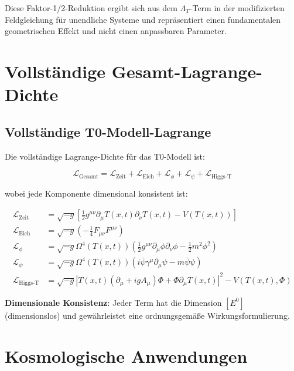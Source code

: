 \documentclass[12pt,a4paper]{article}
\newcommand{\Tfield}{T(x,t)}
\newcommand{\DhiggsT}{\Tfield (\partial_\mu + ig A_\mu) \Phi + \Phi \partial_\mu \Tfield}
\theoremstyle{definition}
\theoremstyle{remark}
\begin{document}
	Diese Faktor-1/2-Reduktion ergibt sich aus dem $\Lambda_T$-Term in der modifizierten Feldgleichung für unendliche Systeme und repräsentiert einen fundamentalen geometrischen Effekt und nicht einen anpassbaren Parameter.
	
	\section{Vollständige Gesamt-Lagrange-Dichte}
	\label{sec:gesamt_lagrange}
	
	\subsection{Vollständige T0-Modell-Lagrange}
	\label{subsec:vollstaendige_lagrange}
	
	Die vollständige Lagrange-Dichte für das T0-Modell ist:
	
	\begin{equation}
		\mathcal{L}_{\text{Gesamt}} = \mathcal{L}_{\text{Zeit}} + \mathcal{L}_{\text{Eich}} + \mathcal{L}_{\phi} + \mathcal{L}_{\psi} + \mathcal{L}_{\text{Higgs-T}}
		\label{eq:gesamt_lagrange}
	\end{equation}
	
	wobei jede Komponente dimensional konsistent ist:
	
	\begin{align}
		\mathcal{L}_{\text{Zeit}} &= \sqrt{-g} \left[\frac{1}{2} g^{\mu\nu} \partial_\mu \Tfield \partial_\nu \Tfield - V(\Tfield)\right] \\
		\mathcal{L}_{\text{Eich}} &= \sqrt{-g} \left(-\frac{1}{4} F_{\mu\nu} F^{\mu\nu}\right) \\
		\mathcal{L}_{\phi} &= \sqrt{-g} \Omega^4(\Tfield) \left(\frac{1}{2} g^{\mu\nu} \partial_\mu \phi \partial_\nu \phi - \frac{1}{2} m^2 \phi^2\right) \\
		\mathcal{L}_{\psi} &= \sqrt{-g} \Omega^4(\Tfield) \left(i\bar{\psi}\gamma^\mu\partial_\mu\psi - m\bar{\psi}\psi\right) \\
		\mathcal{L}_{\text{Higgs-T}} &= \sqrt{-g} |\DhiggsT|^2 - V(\Tfield, \Phi)
	\end{align}
	
	\textbf{Dimensionale Konsistenz}: Jeder Term hat die Dimension $[E^0]$ (dimensionslos) und gewährleistet eine ordnungsgemäße Wirkungsformulierung.
	
	\section{Kosmologische Anwendungen}
	\label{sec:kosmologische_anwendungen}
	
\end{document}
